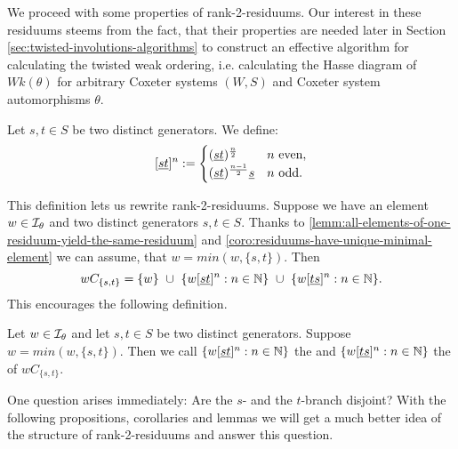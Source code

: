 We proceed with some properties of rank-2-residuums. Our interest in these residuums steems from the fact, that their properties are needed later in Section \ref{sec:twisted-involutions-algorithms} to construct an effective algorithm for calculating the twisted weak ordering, i.e. calculating the Hasse diagram of $Wk(\theta)$ for arbitrary Coxeter systems $(W,S)$ and Coxeter system automorphisms $\theta$.

\begin{defi}
	Let $s,t \in S$ be two distinct generators. We define:
	$$[\underline{s} \underline{t}]^n :=
	\begin{cases}
	(\underline{s} \underline{t})^{\frac{n}{2}} & n \textrm{ even}, \\
	(\underline{s} \underline{t})^{\frac{n-1}{2}} \underline{s} & n \textrm{ odd}. 
	\end{cases}$$
\end{defi}

This definition lets us rewrite rank-2-residuums. Suppose we have an element $w \in \mathcal{I}_{\theta}$ and two distinct generators $s,t \in S$. Thanks to \ref{lemm:all-elements-of-one-residuum-yield-the-same-residuum} and \ref{coro:residuums-have-unique-minimal-element} we can assume, that $w = min(w,\{s,t\})$. Then
$$ wC_{\{s,t\}} = \{ w \} \ \cup \ \{ w [\underline{s} \underline{t}]^n : n \in \mathbb{N} \} \ \cup \ \{ w [\underline{t} \underline{s}]^n : n \in \mathbb{N} \}. $$
This encourages the following definition.

\begin{defi}
	Let $w \in \mathcal{I}_{\theta}$ and let $s,t \in S$ be two distinct generators. Suppose $w = min(w,\{s,t\})$. Then we call $\{ w [\underline{s} \underline{t}]^n : n \in \mathbb{N} \}$ the  and $\{ w [\underline{t} \underline{s}]^n : n \in \mathbb{N} \}$ the  of $wC_{\{s,t\}}$.
\end{defi}

One question arises immediately: Are the $s$- and the $t$-branch disjoint? With the following propositions, corollaries and lemmas we will get a much better idea of the structure of rank-2-residuums and answer this question.


